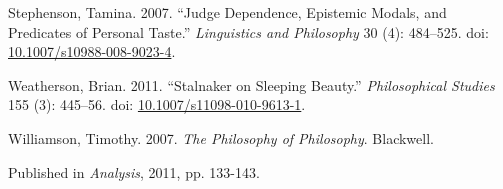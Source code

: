 \documentclass[
  10pt,
  letterpaper,
  DIV=11,
  numbers=noendperiod,
  twoside]{scrartcl}
\newlength{\cslhangindent}
\newenvironment{CSLReferences}[2] %
 {\begin{list}{}{%
  \setlength{\itemindent}{0pt}
  \setlength{\leftmargin}{0pt}
  \setlength{\parsep}{0pt}
  \ifodd #1
   \setlength{\leftmargin}{\cslhangindent}
   \setlength{\itemindent}{-1\cslhangindent}
  \fi
  \setlength{\itemsep}{#2\baselineskip}}}
 {\end{list}}
\begin{document}
\begin{CSLReferences}{1}{0}
Stephenson, Tamina. 2007. {``Judge Dependence, Epistemic Modals, and
Predicates of Personal Taste.''} \emph{Linguistics and Philosophy} 30
(4): 484--525. doi:
\href{https://doi.org/10.1007/s10988-008-9023-4}{10.1007/s10988-008-9023-4}.

Weatherson, Brian. 2011. {``Stalnaker on Sleeping Beauty.''}
\emph{Philosophical Studies} 155 (3): 445--56. doi:
\href{https://doi.org/10.1007/s11098-010-9613-1}{10.1007/s11098-010-9613-1}.

Williamson, Timothy. 2007. \emph{{The Philosophy of Philosophy}}.
Blackwell.

\end{CSLReferences}



\noindent Published in\emph{
Analysis}, 2011, pp. 133-143.
\end{document}
